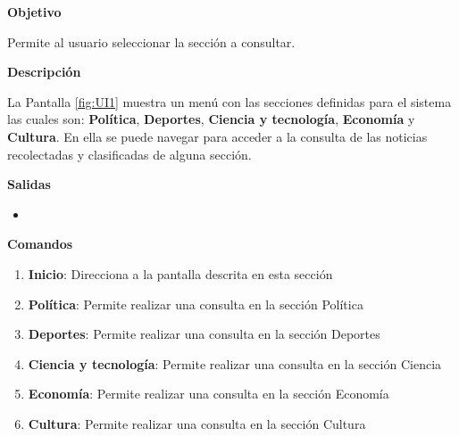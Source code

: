 \begin{large}
  \textbf{Objetivo}\\
\end{large}


Permite al usuario seleccionar la sección a consultar.\\

\begin{large}
  \textbf{Descripción}\\
\end{large}

La Pantalla \ref{fig:UI1} muestra un menú con las secciones definidas para el sistema las cuales son: \textbf{Política}, \textbf{Deportes}, \textbf{Ciencia y tecnología}, \textbf{Economía} y \textbf{Cultura}. En ella se puede navegar para acceder a la consulta de las noticias recolectadas y clasificadas de alguna sección.\\

\begin{large}
  \textbf{Salidas}
\end{large}

\begin{itemize}

  \item {}

\end{itemize}


\textbf{Comandos}

\begin{enumerate}

  \item \textbf{Inicio}: Direcciona a la pantalla descrita en esta sección
  \item \textbf{Política}: Permite realizar una consulta en la sección Política
  \item \textbf{Deportes}: Permite realizar una consulta en la sección Deportes
  \item \textbf{Ciencia y tecnología}: Permite realizar una consulta en la sección Ciencia
  \item \textbf{Economía}: Permite realizar una consulta en la sección Economía
  \item \textbf{Cultura}: Permite realizar una consulta en la sección Cultura

\end{enumerate}

